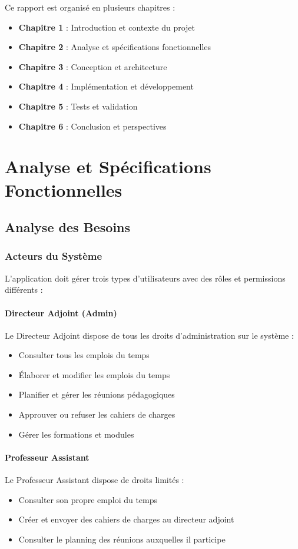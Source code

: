 \documentclass[12pt,a4paper]{report}
\begin{document}
Ce rapport est organisé en plusieurs chapitres :

\begin{itemize}
    \item \textbf{Chapitre 1} : Introduction et contexte du projet
    \item \textbf{Chapitre 2} : Analyse et spécifications fonctionnelles
    \item \textbf{Chapitre 3} : Conception et architecture
    \item \textbf{Chapitre 4} : Implémentation et développement
    \item \textbf{Chapitre 5} : Tests et validation
    \item \textbf{Chapitre 6} : Conclusion et perspectives
\end{itemize}

\chapter{Analyse et Spécifications Fonctionnelles}

\section{Analyse des Besoins}

\subsection{Acteurs du Système}

L'application doit gérer trois types d'utilisateurs avec des rôles et permissions différents :

\subsubsection{Directeur Adjoint (Admin)}
Le Directeur Adjoint dispose de tous les droits d'administration sur le système :
\begin{itemize}
    \item Consulter tous les emplois du temps
    \item Élaborer et modifier les emplois du temps
    \item Planifier et gérer les réunions pédagogiques
    \item Approuver ou refuser les cahiers de charges
    \item Gérer les formations et modules
\end{itemize}

\subsubsection{Professeur Assistant}
Le Professeur Assistant dispose de droits limités :
\begin{itemize}
    \item Consulter son propre emploi du temps
    \item Créer et envoyer des cahiers de charges au directeur adjoint
    \item Consulter le planning des réunions auxquelles il participe
\end{itemize}
\end{document}
